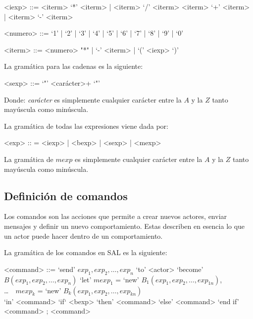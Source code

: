 \begin{grammar}

<iexp> ::= <iterm> `*' <iterm> | <iterm> `/' <iterm>  
  \alt <iterm> `+' <iterm>  | <iterm> `-' <iterm>

<numero> ::= `1' | `2' | `3' | `4' | `5' | `6' | `7' | `8' | `9' | `0'

<iterm> ::= <numero> "*" | `-' <iterm> | `(' <iexp> `)'

\end{grammar}

La gramática para las cadenas es la siguiente:

\begin{grammar}
 <sexp> ::= `"' <carácter>+ `"'
\end{grammar}

Donde: \textit{carácter} es simplemente cualquier carácter entre la $A$ y la $Z$ tanto mayúscula como minúscula.

La gramática de todas las expresiones viene dada por:

\begin{grammar}
<exp> :: = <iexp> | <bexp> | <sexp> | <mexp>  
\end{grammar}

La gramática de $mexp$ es simplemente cualquier carácter entre la $A$ y la $Z$ tanto mayúscula como minúscula. 

\subsection{Definición de comandos}\label{actores:cmd}

Los comandos son las acciones que permite a \SAL crear nuevos actores, enviar mensajes y definir un nuevo comportamiento. Estas describen en esencia lo que un actor puede hacer dentro de un comportamiento.

La gramática de los comandos en SAL es la siguiente:

\begin{grammar}
  <command> ::= `send' $exp_1, exp_2, \ldots, exp_n$ `to' <actor>  
  \alt `become' $B(exp_1, exp_2, \ldots, exp_n)$
  \alt `let' $mexp_1$ = `new' $B_1(exp_1, exp_2, \ldots, exp_{1n})$, \\
   \ldots\ \ $mexp_k$ = `new' $B_k(exp_1, exp_2, \ldots, exp_{kn})$   \\
  `in' <command> 
  \alt `if` <bexp> `then' <command> `else' <command> `end if'
  \alt <command> ; <command>
\end{grammar}

